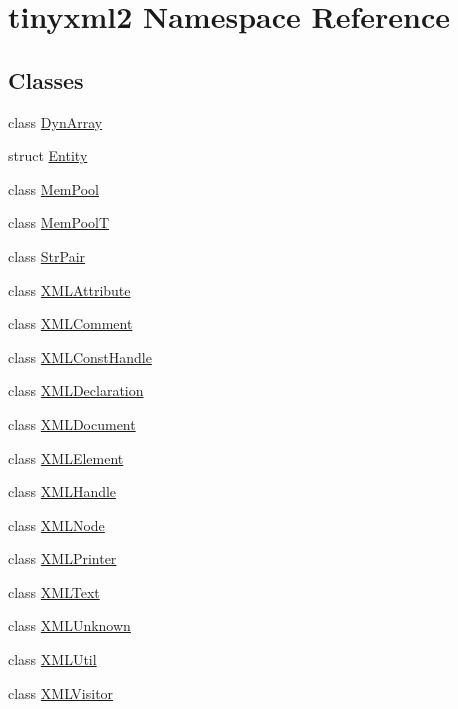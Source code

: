 \hypertarget{namespacetinyxml2}{\section{tinyxml2 Namespace Reference}
\label{namespacetinyxml2}
}
\subsection*{Classes}
\begin{DoxyCompactItemize}
\item 
class \hyperlink{classtinyxml2_1_1_dyn_array}{Dyn\+Array}
\item 
struct \hyperlink{structtinyxml2_1_1_entity}{Entity}
\item 
class \hyperlink{classtinyxml2_1_1_mem_pool}{Mem\+Pool}
\item 
class \hyperlink{classtinyxml2_1_1_mem_pool_t}{Mem\+Pool\+T}
\item 
class \hyperlink{classtinyxml2_1_1_str_pair}{Str\+Pair}
\item 
class \hyperlink{classtinyxml2_1_1_x_m_l_attribute}{X\+M\+L\+Attribute}
\item 
class \hyperlink{classtinyxml2_1_1_x_m_l_comment}{X\+M\+L\+Comment}
\item 
class \hyperlink{classtinyxml2_1_1_x_m_l_const_handle}{X\+M\+L\+Const\+Handle}
\item 
class \hyperlink{classtinyxml2_1_1_x_m_l_declaration}{X\+M\+L\+Declaration}
\item 
class \hyperlink{classtinyxml2_1_1_x_m_l_document}{X\+M\+L\+Document}
\item 
class \hyperlink{classtinyxml2_1_1_x_m_l_element}{X\+M\+L\+Element}
\item 
class \hyperlink{classtinyxml2_1_1_x_m_l_handle}{X\+M\+L\+Handle}
\item 
class \hyperlink{classtinyxml2_1_1_x_m_l_node}{X\+M\+L\+Node}
\item 
class \hyperlink{classtinyxml2_1_1_x_m_l_printer}{X\+M\+L\+Printer}
\item 
class \hyperlink{classtinyxml2_1_1_x_m_l_text}{X\+M\+L\+Text}
\item 
class \hyperlink{classtinyxml2_1_1_x_m_l_unknown}{X\+M\+L\+Unknown}
\item 
class \hyperlink{classtinyxml2_1_1_x_m_l_util}{X\+M\+L\+Util}
\item 
class \hyperlink{classtinyxml2_1_1_x_m_l_visitor}{X\+M\+L\+Visitor}
\end{DoxyCompactItemize}

